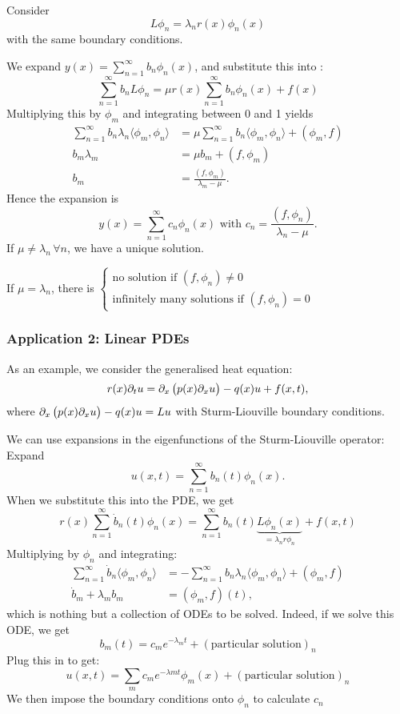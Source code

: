 Consider
\[
L \phi_n = \lambda_n r(x) \phi_n(x)
\]
with the same boundary conditions.

We expand $y(x) = \sum_{n=1}^{\infty} b_n \phi_n(x)$,
and substitute this into :
\[
\sum_{n=1}^{\infty} b_n L \phi_n = \mu r(x) \sum_{n=1}^{\infty} b_n \phi_n(x) + f(x)
\]
Multiplying this by $\phi_m$ and integrating between 0 and 1 yields
\begin{align*}
	\sum_{n=1}^{\infty} b_n \lambda_n \langle \phi_m, \phi_n\rangle &= \mu \sum_{n=1}^{\infty} b_n \langle \phi_m, \phi_n\rangle + (\phi_m, f) \\
	b_m \lambda_m &= \mu b_m + (f, \phi_m) \\
	b_m &= \frac{(f, \phi_m)}{\lambda_m - \mu}.
\end{align*}
Hence the expansion is
\[
y(x) = \sum^{\infty}_{n=1} c_n \phi_n(x) \text{ with } c_n = \frac{(f, \phi_n)}{\lambda_n - \mu}.
\]
If $\mu \neq \lambda_n \,\forall n$, we have a unique solution.

If $\mu = \lambda_n$, there is $\begin{cases} \text{no solution if } (f, \phi_n) \neq 0 \\ \text{infinitely many solutions if } (f, \phi_n) = 0 \end{cases}$

\subsubsection*{Application 2: Linear PDEs}

\begin{eg}
	As an example, we consider the generalised heat equation:
	\[
	r(x) \partial_t u = \partial_x\left(p(x) \partial_x u\right) - q(x) u + f(x,t),
	\]
	where $\partial_x\left(p(x) \partial_x u\right) - q(x) u = Lu$ with Sturm-Liouville boundary conditions.
	
	We can use expansions in the eigenfunctions of the Sturm-Liouville operator: Expand
	\[
	u(x,t) = \sum_{n=1}^{\infty} b_n(t) \phi_n(x).
	\]
	When we substitute this into the PDE, we get
	\[
	r(x) \sum_{n=1}^{\infty} \dot{b}_n(t) \phi_n(x) = \sum_{n=1}^{\infty} b_n(t) \underbrace{L \phi_n(x)}_{=\lambda_nr\phi_n} + f(x,t)
	\]
	Multiplying by $\phi_n$ and integrating:
	\begin{align*}
		\sum_{n=1}^{\infty} \dot{b}_n \langle \phi_m, \phi_n\rangle &= - \sum_{n=1}^{\infty} b_n \lambda_n \langle \phi_m, \phi_n\rangle + (\phi_m, f) \\
		\dot{b}_m + \lambda_m b_m &= (\phi_m, f)(t),
	\end{align*}
	which is nothing but a collection of ODEs to be solved. Indeed, if we solve this ODE, we get
	\[
	b_m(t) = c_m e^{-\lambda_m t} + (\text{particular solution})_n
	\]
	Plug this in to get:
	\[
	u(x,t) = \sum_m c_m e^{-\lambda m t} \phi_m(x) + (\text{particular solution})_n
	\]
	We then impose the boundary conditions onto $\phi_n$ to calculate $c_n$
\end{eg}

